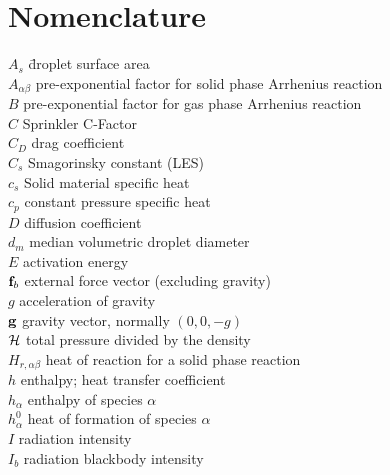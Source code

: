 
\chapter{Nomenclature}
\label{nomenclature}

\begin{tabbing}
$A_s$ \hspace{1in}        \= droplet surface area \\
$A_{\alpha\beta}$          \> pre-exponential factor for solid phase Arrhenius reaction \\
$B$                       \> pre-exponential factor for gas phase Arrhenius reaction \\
$C$                       \> Sprinkler C-Factor \\
$C_D$                     \> drag coefficient \\
$C_s$                     \> Smagorinsky constant (LES)  \\
$c_s$                     \> Solid material specific heat \\
$c_p$                     \> constant pressure specific heat \\
$D$                       \> diffusion coefficient   \\
$d_m$                     \> median volumetric droplet diameter \\
$E$                       \> activation energy \\
${\bf f}_b$                  \> external force vector (excluding gravity) \\
$g$                       \> acceleration of gravity \\
${\bf g}$                     \> gravity vector, normally $(0,0,-g)$ \\
$\cal H$                  \> total pressure divided by the density \\
$H_{r,\alpha\beta}$       \> heat of reaction for a solid phase reaction \\
$h$                       \> enthalpy; heat transfer coefficient   \\
$h_\alpha$                \> enthalpy of species $\alpha$   \\
$h_\alpha^0$              \> heat of formation of species $\alpha$   \\
$I$                       \> radiation intensity   \\
$I_b$                     \> radiation blackbody intensity   \\

\end{tabbing}
